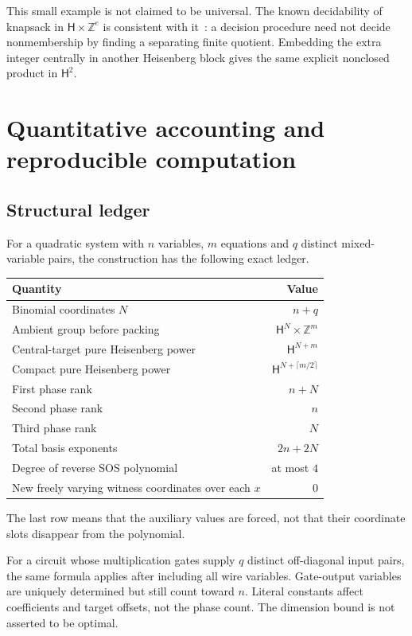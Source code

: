 \documentclass[11pt,letterpaper]{article}
\theoremstyle{definition}
\theoremstyle{remark}
\newcommand{\ZZ}{\mathbb Z}
\newcommand{\HH}{\mathsf H}
\begin{document}
This small example is not claimed to be universal. The known decidability
of knapsack in $\HH\times\ZZ^e$ is consistent with it~\cite{KLZ}: a decision
procedure need not decide nonmembership by finding a separating finite
quotient. Embedding the extra integer centrally in another Heisenberg block
gives the same explicit nonclosed product in $\HH^2$.

\section{Quantitative accounting and reproducible computation}
\label{gts:tp:sec:implementation}

\subsection{Structural ledger}
For a quadratic system with $n$ variables, $m$ equations and $q$ distinct
mixed-variable pairs, the construction has the following exact ledger.
\begin{center}
\begin{tabular}{@{}lr@{}}
\toprule
Quantity & Value\\
\midrule
Binomial coordinates $N$ & $n+q$\\
Ambient group before packing & $\HH^N\times\ZZ^m$\\
Central-target pure Heisenberg power & $\HH^{N+m}$\\
Compact pure Heisenberg power & $\HH^{N+\lceil m/2\rceil}$\\
First phase rank & $n+N$\\
Second phase rank & $n$\\
Third phase rank & $N$\\
Total basis exponents & $2n+2N$\\
Degree of reverse SOS polynomial & at most $4$\\
New freely varying witness coordinates over each $x$ & $0$\\
\bottomrule
\end{tabular}
\end{center}
The last row means that the auxiliary values are forced, not that their
coordinate slots disappear from the polynomial.

For a circuit whose multiplication gates supply $q$ distinct off-diagonal
input pairs, the same formula applies after including all wire variables.
Gate-output variables are uniquely determined but still count toward $n$.
Literal constants affect coefficients and target offsets, not the phase
count. The dimension bound is not asserted to be optimal.
\end{document}
